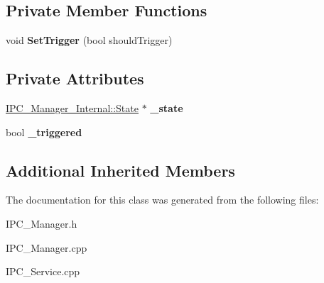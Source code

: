 \subsection*{Private Member Functions}
\begin{DoxyCompactItemize}
\item 
\mbox{\label{class_ipc_service_monitor_a425dfbd0bbd2a633068f72d3016be37e}} 
void {\bfseries Set\+Trigger} (bool should\+Trigger)
\end{DoxyCompactItemize}
\subsection*{Private Attributes}
\begin{DoxyCompactItemize}
\item 
\mbox{\label{class_ipc_service_monitor_a4a9fd4b2213be93b30d26f334897e9f5}} 
\hyperlink{class_i_p_c___manager___internal_1_1_state}{I\+P\+C\+\_\+\+Manager\+\_\+\+Internal\+::\+State} $\ast$ {\bfseries \+\_\+state}
\item 
\mbox{\label{class_ipc_service_monitor_aff2673ca842e0f9aaf81745ec9de43d5}} 
bool {\bfseries \+\_\+triggered}
\end{DoxyCompactItemize}
\subsection*{Additional Inherited Members}


The documentation for this class was generated from the following files\+:\begin{DoxyCompactItemize}
\item 
I\+P\+C\+\_\+\+Manager.\+h\item 
I\+P\+C\+\_\+\+Manager.\+cpp\item 
I\+P\+C\+\_\+\+Service.\+cpp\end{DoxyCompactItemize}

